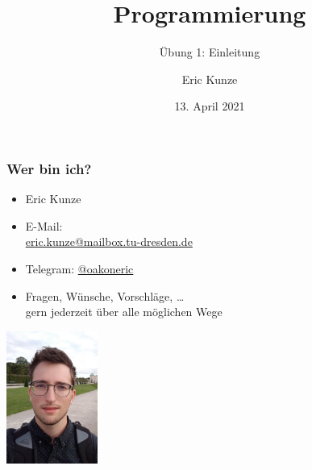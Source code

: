 \documentclass{beamer}
\begin{document}
	
	\title{Programmierung}
	\subtitle{Übung 1: Einleitung}
	\author{Eric Kunze}
	\date{13. April 2021}

	\maketitle
	
	\begin{frame} \frametitle{Wer bin ich?}
		\begin{minipage}{\dimexpr0.75\linewidth-\fboxrule-\fboxsep}
			\begin{itemize}
				\item Eric \textcolor{cdgray!50}{Kunze}
				\item E-Mail: \\
				\url{eric.kunze@mailbox.tu-dresden.de}
				\item Telegram: \url{@oakoneric}
				\item Fragen, Wünsche, Vorschläge, \dots \\
				gern jederzeit über alle möglichen Wege
			\end{itemize}
		\end{minipage}
		\begin{minipage}{\dimexpr0.25\linewidth-\fboxrule-\fboxsep}
			\includegraphics[width=3cm]{./tut01_pic.jpg}
		\end{minipage}
	\end{frame}
\end{document}
